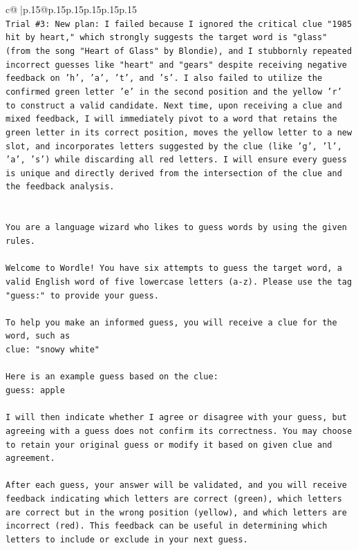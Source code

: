 \documentclass{article}
\begin{document}
{\begin{supertabular}{c@{$\;$}|p{.15\linewidth}@{}p{.15\linewidth}p{.15\linewidth}p{.15\linewidth}p{.15\linewidth}p{.15\linewidth}}
{{{\\ 
\texttt{Trial \#3: New plan: I failed because I ignored the critical clue "1985 hit by heart," which strongly suggests the target word is "glass" (from the song "Heart of Glass" by Blondie), and I stubbornly repeated incorrect guesses like "heart" and "gears" despite receiving negative feedback on 'h', 'a', 't', and 's'. I also failed to utilize the confirmed green letter 'e' in the second position and the yellow 'r' to construct a valid candidate. Next time, upon receiving a clue and mixed feedback, I will immediately pivot to a word that retains the green letter in its correct position, moves the yellow letter to a new slot, and incorporates letters suggested by the clue (like 'g', 'l', 'a', 's') while discarding all red letters. I will ensure every guess is unique and directly derived from the intersection of the clue and the feedback analysis.} \\
\\ 
\\ 
\texttt{You are a language wizard who likes to guess words by using the given rules.} \\
\\ 
\texttt{Welcome to Wordle! You have six attempts to guess the target word, a valid English word of five lowercase letters (a{-}z). Please use the tag "guess:" to provide your guess.} \\
\\ 
\texttt{To help you make an informed guess, you will receive a clue for the word, such as} \\
\texttt{clue: "snowy white"} \\
\\ 
\texttt{Here is an example guess based on the clue: } \\
\texttt{guess: apple} \\
\\ 
\texttt{I will then indicate whether I agree or disagree with your guess, but agreeing with a guess does not confirm its correctness. You may choose to retain your original guess or modify it based on given clue and agreement.} \\
\\ 
\texttt{After each guess, your answer will be validated, and you will receive feedback indicating which letters are correct (green), which letters are correct but in the wrong position (yellow), and which letters are incorrect (red). This feedback can be useful in determining which letters to include or exclude in your next guess.} \\
}}}
\end{supertabular}}
\end{document}
